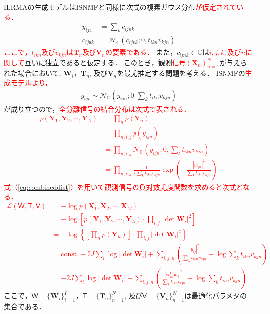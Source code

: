 ILRMAの生成モデルはISNMFと同様に次式の複素ガウス分布\textcolor{red}{が仮定されている．}
\begin{align}
    y_{ijn} &= \sum_k c_{ijnk} \\
    c_{ijnk} &= \mathcal{N}_{\mathbb{C}}(c_{ijnk}; 0, t_{ikn} v_{kjn}) \label{eq:ilrma_gen}
\end{align}
\textcolor{red}{ここで，$t_{ikn}$及び$v_{kjn}$は$\bm{T}_n$及び$\bm{V}_n$の要素である．}
また，$c_{ijnk} \in \mathbb{C}$は\textcolor{red}{$i, j, k, $及び$n$に関して}互いに独立であると仮定する．
このとき，観測\textcolor{red}{信号$(\bm{X}_n)_{n=1}^N$}が与えられた場合において, $\bm{W}_i$，$\bm{T}_n$, 及び$\bm{V}_n$を最尤推定する問題を考える．
ISNMFの\textcolor{red}{生成モデルより，}
\begin{align}
    y_{ijn} \sim \mathcal{N}_{\mathbb{C}}\left(y_{ijn};  0, \sum_k t_{ikn} v_{kjn} \right) 
\end{align}
が成り立つので，\textcolor{red}{全分離信号の結合分布は次式で表される．}
\textcolor{red}{
\begin{align}
    \nonumber p(\bm{Y}_1, \bm{Y}_2, \cdots, \bm{Y}_N) &= \prod_n p(\bm{Y}_n) \\
\nonumber &= \prod_{n, i, j} p(y_{ijn}) \\
\nonumber &= \prod_{n, i, j} \mathcal{N}_{\mathbb{C}} \left(y_{ijn}; 0, \sum_k t_{ikn}v_{kjn} \right) \\
&= \prod_{n, i, j} \frac{1}{\pi \sum_k t_{ikn}v_{kjn}} \exp \left( -\frac{|y_{ijn}|^2}{\sum_k t_{ikn}v_{kjn}} \right) \label{eq:combineddist}
\end{align}}
\textcolor{red}{式（\ref{eq:combineddist}）を用いて観測信号の負対数尤度関数を求めると次式となる．}
\textcolor{red}{
\begin{align}
　　\nonumber \mathcal{L}(\mathsf{W, T, V}) &= - \log p(\bm{X}_1, \bm{X}_2, \cdots, \bm{X}_M) \\
    \nonumber &= -\log \left[p(\bm{Y}_1, \bm{Y}_2, \cdots, \bm{Y}_N) \cdot \prod_{i, j} |\det \bm{W}_i|^2\right] \\
    \nonumber &= -\log \left \{ \left[\prod_n p(\bm{Y}_n) \right] \cdot \prod_{i, j} |\det \bm{W}_i|^2\right \} \\
    \nonumber &= \mathrm{const.}- 2J \sum_{i}  \log |\det \bm{W}_i| +\sum_{i,j,n} \left( \frac{|y_{ij}|^2}{\sum_k t_{ikn} v_{kjn}} + \log \sum_k t_{ikn} v_{kjn}\right) \\
    &= -2J \sum_i \log | \det \bm{W}_i | + \sum_{i,j,n} \left( \frac{|\bm{w}_{in}^{\mathrm{H}}\bm{x}_{ij}|^2}{\sum_k t_{ikn}v_{kjn}} + \log \sum_k t_{ikn}v_{kjn} \right)
    \label{eq:ilrmalike2}
\end{align}}
ここで，$\mathsf{W}=\{ \bm{W}_i \}_{i=1}^I$，$\mathsf{T}=\{ \bm{T}_n \}_{n=1}^N$, 及び$\mathsf{V}=\{ \bm{V}_n \}_{n=1}^N$は最適化パラメタの集合である．

